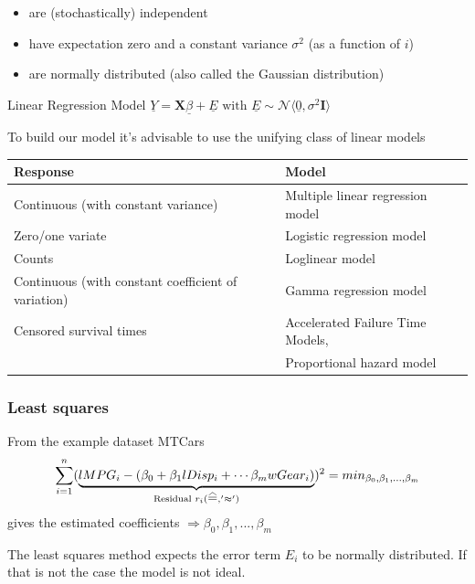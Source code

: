 \documentclass[11pt]{article}
\newcommand\equalhat{\mathrel{\stackon[1.5pt]{=}{\stretchto{%
				\scalerel*[\widthof{=}]{\wedge}{\rule{1ex}{3ex}}}{0.5ex}}}}
\begin{document}
\begin{itemize}
	\item are (stochastically) independent
	\item have expectation zero and a constant variance $\sigma^2$ (as a function of $i$)
	\item are normally distributed (also called the Gaussian distribution)
\end{itemize}

\noindent
\begin{theorem}
	Linear Regression Model $\underline{Y} = \textbf{X} \underline{\beta} + \underline{E}\text{ with } \underline{E} \sim \mathcal{N}\langle \underline{0},\sigma^2\textbf{I}\rangle$
\end{theorem}

\vspace{1em}
\noindent
To build our model it's advisable to use the unifying class of linear models

\vspace{1em}
\begin{tabular}{l l}
	\hline
	Response & Model \\
	\hline
	Continuous (with constant variance) & Multiple linear regression model \\
	Zero/one variate & Logistic regression model \\
	Counts & Loglinear model \\
	Continuous (with constant coefficient of variation) & Gamma regression model \\
	Censored survival times & Accelerated Failure Time Models,\\
	& Proportional hazard model \\
	\hline
\end{tabular}

\subsubsection{Least squares}
From the example dataset MTCars
\begin{equation*}
    \sum_{i=1}^n ( \underbrace{lMPG_i - (\beta_0 + \beta_1 lDisp_i + \cdots \beta_m wGear_i)}_{\text{Residual }r_i (\equalhat,'\approx')})^2 = min_{\beta_0, \beta_1, ..., \beta_m }
\end{equation*}
gives the estimated coefficients $\Rightarrow \beta_0, \beta_1, ..., \beta_m $

\vspace{1em}

\noindent
The least squares method expects the error term $E_i$ to be normally distributed. If that is not the case the model is not ideal.
\end{document}
